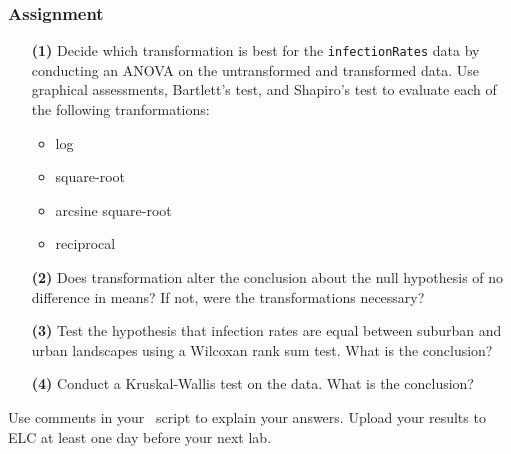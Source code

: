 \documentclass[color=usenames,dvipsnames]{beamer}\usepackage[]{graphicx}\usepackage[]{color}
\newcommand{\inr}[1]{\colorbox{inlinecolor}{\texttt{#1}}}
\begin{document}




\begin{frame}
  \frametitle{Assignment}
  \footnotesize
  \begin{enumerate}
    \item[\bf (1)] Decide which transformation is best for the
      \inr{infectionRates} data by conducting an ANOVA on the
      untransformed and transformed data. Use graphical assessments,
      Bartlett's test, and Shapiro's test to evaluate each of the
      following tranformations:
      \begin{itemize}
        \item log
        \item square-root
        \item arcsine square-root
        \item reciprocal
      \end{itemize}
    \item[\bf (2)] Does transformation alter the conclusion about the
      null hypothesis of no difference in means? If not, were the
      transformations necessary?
    \item[\bf (3)] Test the hypothesis that infection rates are equal
      between suburban and urban landscapes using a Wilcoxan rank sum
      test. What is the conclusion?
    \item[\bf (4)] Conduct a Kruskal-Wallis test on the data. What
      is the conclusion? %
  \end{enumerate}
  \vfill
  Use comments in your \R~script to explain your answers. Upload your
  results to ELC at least one day before your next lab.\\
\end{frame}
\end{document}
